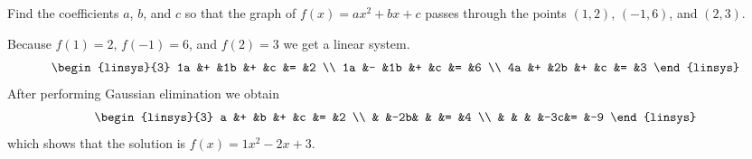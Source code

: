 

\begin{Exercise}[
name={},
title={}, 
difficulty=0,
origin={\cite{JH}}]
Find the coefficients
\( a \), \( b \), and \( c \) so that the graph of \( f(x)=ax^2+bx+c \) 
passes through the points \( (1,2) \), \( (-1,6) \), and \( (2,3) \).
\end{Exercise}

\begin{Answer}
Because \( f(1)=2 \), \( f(-1)=6 \), and \( f(2)=3 \) we get
a linear system.
\begin{equation*}
\begin{linsys}{3}
1a  &+  &1b  &+  &c  &=  &2  \\
1a  &-  &1b  &+  &c  &=  &6  \\
4a  &+  &2b  &+  &c  &=  &3  
\end{linsys}
\end{equation*}
After performing Gaussian elimination we obtain
\begin{equation*}
\begin{linsys}{3}
a  &+  &b  &+  &c  &=  &2  \\
&   &-2b&   &   &=  &4  \\
&   &   &   &-3c&=  &-9 
\end{linsys}
\end{equation*}
which shows that the solution is \( f(x)=1x^2-2x+3 \).  

\end{Answer}
